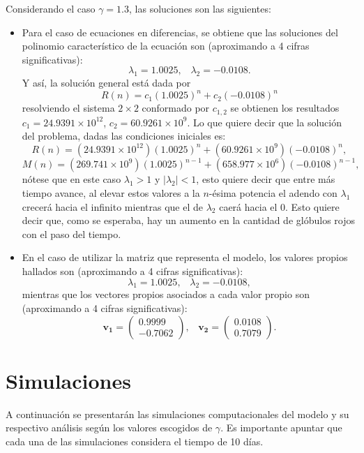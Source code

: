 Considerando el caso $\gamma = 1.3$, las soluciones son las siguientes:
\begin{itemize}
    \item Para el caso de ecuaciones en diferencias, se obtiene que las soluciones del polinomio característico de la ecuación son (aproximando a 4 cifras significativas):
        $$\lambda_1 = 1.0025,\;\;\; \lambda_2 = -0.0108.$$
        Y así, la solución general está dada por 
        $$R(n)=c_1(1.0025)^n+c_2(-0.0108)^n$$
        resolviendo el sistema $2\times 2$ conformado por $c_{1,2}$ se obtienen los resultados $c_1=24.9391\times 10^{12}$, $c_2 = 60.9261\times 10^{9}$. Lo que quiere decir que la solución del problema, dadas las condiciones iniciales es:
        $$R(n)=(24.9391\times 10^{12})(1.0025)^n+(60.9261\times 10^{9})(-0.0108)^n,$$
        $$M(n)=(269.741\times 10^{9})(1.0025)^{n-1}+(658.977\times 10^{6})(-0.0108)^{n-1},$$
        nótese que en este caso $\lambda_1>1$ y $|\lambda_2|<1$, esto quiere decir que entre más tiempo avance, al elevar estos valores a la $n$-ésima potencia el adendo con $\lambda_1$ crecerá hacia el infinito mientras que el de $\lambda_2$ caerá hacia el 0. Esto quiere decir que, como se esperaba, hay un aumento en la cantidad de glóbulos rojos con el paso del tiempo.
    \item En el caso de utilizar la matriz que representa el modelo, los valores propios hallados son (aproximando a 4 cifras significativas):
        $$\lambda_1 = 1.0025, \;\;\; \lambda_2 = -0.0108,$$
        mientras que los vectores propios asociados a cada valor propio son (aproximando a 4 cifras significativas):
        $$\mathbf{v_1}=\begin{pmatrix}
            0.9999  \\ 
            -0.7062
            \end{pmatrix},\;\;\;  \mathbf{v_2}=\begin{pmatrix}
            0.0108  \\
            0.7079
            \end{pmatrix}.$$

\end{itemize}

\section{Simulaciones}\label{sec:modelo:simulaciones}
A continuación se presentarán las simulaciones computacionales del modelo y su respectivo análisis según los valores escogidos de $\gamma$. Es importante apuntar que cada una de las simulaciones considera el tiempo de 10 días.


